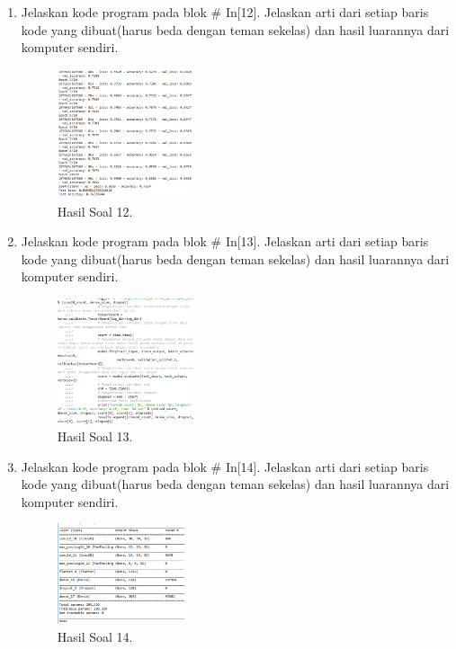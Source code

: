 \begin{enumerate}
    \item Jelaskan kode program pada blok \# In[12]. Jelaskan arti dari setiap baris kode yang dibuat(harus beda dengan teman sekelas) dan hasil luarannya dari komputer sendiri.
    \hfill\break
    
    \begin{figure}[H]
        \centering
            \includegraphics[width=4cm]{figures/1174096/tugas7/praktek_12.PNG}
            \caption{Hasil Soal 12.}
        \end{figure}
        
    \item Jelaskan kode program pada blok \# In[13]. Jelaskan arti dari setiap baris kode yang dibuat(harus beda dengan teman sekelas) dan hasil luarannya dari komputer sendiri.
    \hfill\break
    
    \begin{figure}[H]
        \centering
            \includegraphics[width=4cm]{figures/1174096/tugas7/praktek_13.PNG}
            \caption{Hasil Soal 13.}
        \end{figure}
        
    \item Jelaskan kode program pada blok \# In[14]. Jelaskan arti dari setiap baris kode yang dibuat(harus beda dengan teman sekelas) dan hasil luarannya dari komputer sendiri.
    \hfill\break
    
    \begin{figure}[H]
        \centering
            \includegraphics[width=4cm]{figures/1174096/tugas7/praktek_14.PNG}
            \caption{Hasil Soal 14.}
        \end{figure}
        

\end{enumerate}

